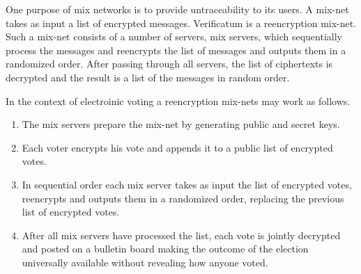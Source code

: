 One purpose of mix networks is to provide untraceability to its
users. A mix-net takes as input a list of encrypted
messages. Verificatum is a reencryption mix-net. Such a mix-net
consists of a number of servers, mix servers, which sequentially
process the messages and reencrypts the list of messages and outputs
them in a randomized order. After passing through all servers, the
list of ciphertexts is decrypted and the result is a list of the
messages in random order.

In the context of electroinic voting a reencryption mix-nets may work
as follows.
\begin{enumerate}
\item The mix servers prepare the mix-net by generating public and
  secret keys.
\item Each voter encrypts his vote and appends it to a public list of
  encrypted votes.
\item In sequential order each mix server takes as input the list of
  encrypted votes, reencrypts and outputs them in a randomized order,
  replacing the previous list of encrypted votes.
\item After all mix servers have processed the list, each vote is
  jointly decrypted and posted on a bulletin board making the outcome
  of the election universally available without revealing how anyone
  voted.
\end{enumerate}

\begin{center}
\end{center}

